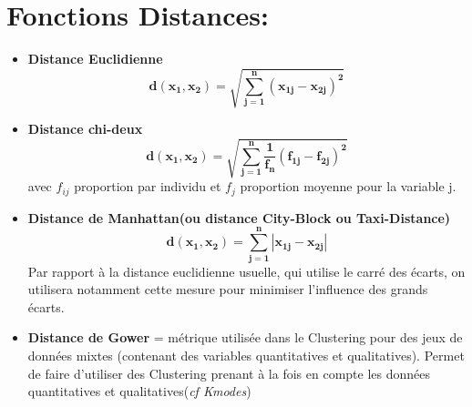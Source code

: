 \documentclass[french]{article}
\begin{document}
	\section{Fonctions Distances: }
	\begin{itemize}[label=\textbullet, font=\LARGE \color{red}]
		\item \textbf{Distance Euclidienne}
		$$\bm{d(x_{1},x_{2})=\sqrt{\sum_{j=1}^{n}(x_{1j}-x_{2j})^{2}}}$$
		
		\item \textbf{Distance chi-deux}
		$$\bm{d(x_{1},x_{2})=\sqrt{\sum_{j=1}^{n}\frac{1}{f_{n}}(f_{1j}-f_{2j})^{2}}}$$
		avec $f_{ij}$ proportion par individu et $f_{j}$ proportion moyenne pour la variable j.\\
		
		\item \textbf{Distance de Manhattan(ou distance City-Block ou Taxi-Distance)}
		$$\bm{d(x_{1},x_{2})=\sum_{j=1}^{n}|x_{1j}-x_{2j}|}$$
		Par rapport à la distance euclidienne usuelle, qui utilise le carré des écarts, on utilisera notamment cette mesure pour minimiser l’influence des grands écarts.\\
		
		\item \textbf{Distance de Gower} = métrique utilisée dans le Clustering pour des
jeux de données mixtes (contenant des variables quantitatives et qualitatives). Permet de faire d'utiliser des Clustering prenant à la fois en compte les données quantitatives et qualitatives(\textit{cf Kmodes})
	\end{itemize}
	
\end{document}
